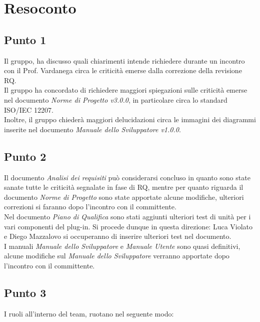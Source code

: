\section{Resoconto}

\subsection{Punto 1}
Il gruppo, ha discusso quali chiarimenti intende richiedere durante un incontro con il Prof. Vardanega circa le criticità emerse dalla correzione della revisione RQ.\\
Il gruppo ha concordato di richiedere maggiori spiegazioni sulle criticità emerse nel documento \textit{Norme di Progetto v3.0.0}, in particolare circa lo standard ISO/IEC 12207. \\
Inoltre, il gruppo chiederà maggiori delucidazioni circa le immagini dei diagrammi inserite nel documento \textit{Manuale dello Sviluppatore v1.0.0}.

\subsection{Punto 2}
Il documento \textit{Analisi dei requisiti} può considerarsi concluso in quanto sono state sanate tutte le criticità segnalate in fase di RQ, mentre per quanto riguarda il documento \textit{Norme di Progetto} sono state apportate alcune modifiche, ulteriori correzioni si faranno dopo l'incontro con il committente.\\
Nel documento \textit{Piano di Qualifica} sono stati aggiunti ulteriori test di unità per i vari componenti del plug-in. Si procede dunque in questa direzione: Luca Violato e Diego Mazzalovo si occuperanno di inserire ulteriori test nel documento. \\
I manuali \textit{Manuale dello Sviluppatore} e \textit{Manuale Utente} sono quasi definitivi, alcune modifiche sul \textit{Manuale dello Sviluppatore} verranno apportate dopo l'incontro con il committente.
 

\subsection{Punto 3}
I ruoli all'interno del team, ruotano nel seguente modo:\\

